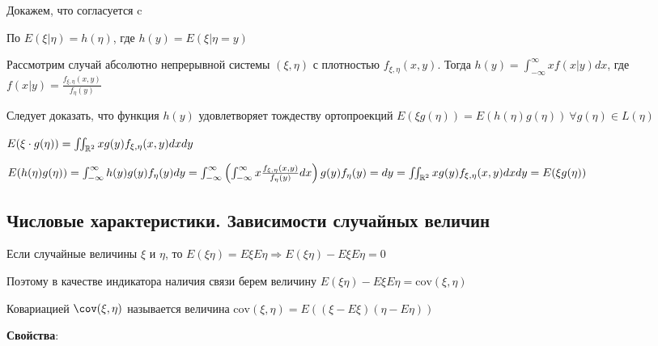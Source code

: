 \documentclass[12pt]{article}
\begin{document}
Докажем, что  согласуется c 

По  $E(\xi|\eta) = h(\eta)$, где $h(y) = E(\xi|\eta = y)$

Рассмотрим случай абсолютно непрерывной системы $(\xi, \eta)$ с плотностью $f_{\xi,\eta}(x, y)$.
Тогда $h(y) = \int_{-\infty}^\infty xf(x|y)dx$, где $f(x|y) = \frac{f_{\xi,\eta}(x, y)}{f_\eta(y)}$

Следует доказать, что функция $h(y)$ удовлетворяет тождеству ортопроекций $E(\xi g(\eta)) = E(h(\eta)g(\eta)) \ \forall g(\eta) \in L(\eta)$

$E(\xi\cdot g(\eta)) = \iint_{\mathbb{R}^2} xg(y) f_{\xi,\eta}(x, y)dxdy$

$E(h(\eta)g(\eta)) = \int_{-\infty}^{\infty} h(y) g(y) f_{\eta}(y) dy = \int_{-\infty}^\infty \left(\int_{-\infty}^\infty x\frac{f_{\xi,\eta}(x, y)}{f_\eta(y)}dx\right) g(y) f_\eta(y) = dy = \iint_{\mathbb{R}^2} xg(y)f_{\xi,\eta}(x, y)dxdy = E(\xi g(\eta))$

\subsection{Числовые характеристики. Зависимости случайных величин}

\Mem Если случайные величины $\xi$ и $\eta$, то $E(\xi\eta) = E\xi E\eta \Longrightarrow E(\xi\eta) - E\xi E\eta = 0$

Поэтому в качестве индикатора наличия связи берем величину $E(\xi\eta) - E\xi E\eta = \mathrm{cov}(\xi, \eta)$

\Def Ковариацией $\mathrm{\cov}(\xi, \eta)$ называется величина $\mathrm{cov}(\xi, \eta) = E((\xi - E\xi)(\eta - E\eta))$

\mediumvspace

\textbf{Свойства}:
\end{document}
